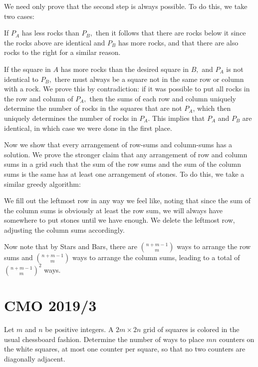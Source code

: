 \documentclass[mast]{lucky}
\begin{document}
We need only prove that the second step is always possible. To do this, we take two cases:
\begin{itemize}
\Item If $P_A$ has less rocks than $P_B,$ then it follows that there are rocks below it since the rocks above are identical and $P_B$ has more rocks, and that there are also rocks to the right for a similar reason.

\Item If the square in $A$ has more rocks than the desired square in $B,$ and $P_A$ is not identical to $P_B,$ there must always be a square not in the same row or column with a rock. We prove this by contradiction: if it was possible to put all rocks in the row and column of $P_A,$ then the sums of each row and column uniquely determine the number of rocks in the squares that are not $P_A$, which then uniquely determines the number of rocks in $P_A.$ This implies that $P_A$ and $P_B$ are identical, in which case we were done in the first place.
\end{itemize}

Now we show that every arrangement of row-sums and column-sums has a solution. We prove the stronger claim that any arrangement of row and column sums in a grid such that the sum of the row sums and the sum of the column sums is the same has at least one arrangement of stones. To do this, we take a similar greedy algorithm:

\begin{itemize}
\Item We fill out the leftmost row in any way we feel like, noting that since the sum of the column sums is obviously at least the row sum, we will always have somewhere to put stones until we have enough.
\Item We delete the leftmost row, adjusting the column sums accordingly.
\end{itemize}

Now note that by Stars and Bars, there are $\binom{n+m-1}{m}$ ways to arrange the row sums and $\binom{n+m-1}{m}$ ways to arrange the column sums, leading to a total of $\binom{n+m-1}{m}^2$ ways.

\pagebreak\section{CMO 2019/3}

Let $m$ and $n$ be positive integers. A $2m\times 2n$ grid of squares is colored in the usual chessboard fashion. Determine the number of ways to place $mn$ counters on the white squares, at most one counter per square, so that no two counters are diagonally adjacent.
\end{document}
